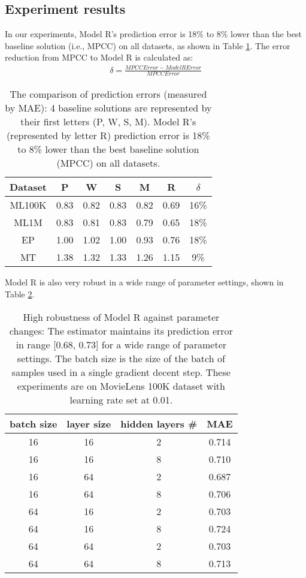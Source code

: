 \documentclass[sigconf]{acmart}
\begin{document}
\subsection{Experiment results}
In our experiments, Model R's prediction error is 18\% to 8\% lower than
the best baseline solution (i.e., MPCC) on all datasets, as shown in Table 
\ref{tab:errors}.
The error reduction from MPCC to Model R is calculated as:
\begin{align*}
	\delta = \frac{MPCCError - ModelRError}{MPCCError}
\end{align*}
\begin{table}[!htb]
	\centering
	\caption{The comparison of prediction errors (measured by MAE): 4 baseline
		solutions are represented by their first letters (P, W, S, M).
		Model R's (represented by letter R) prediction error is 18\% to 8\% 
		lower than the best baseline 
		solution (MPCC) on all datasets.
		}
	\begin{tabular}{ccccccc} \hline
		Dataset & P    & W    & S    & M    & R    & $ \delta $ \\ \hline
		ML100K  & 0.83 & 0.82 & 0.83 & 0.82 & 0.69 & 16\% \\ \hline
		ML1M    & 0.83 & 0.81 & 0.83 & 0.79 & 0.65 & 18\% \\ \hline
		EP      & 1.00 & 1.02 & 1.00 & 0.93 & 0.76 & 18\% \\ \hline
		MT      & 1.38 & 1.32 & 1.33 & 1.26 & 1.15 & 9\%  \\ \hline
	\end{tabular}
	\label{tab:errors}
\end{table}
Model R is also very robust in a wide range of parameter settings, shown in 
Table \ref{tab:robust}.
\begin{table}[!htb]
	\centering
	\caption{High robustness of Model R against parameter changes:
		The estimator maintains its prediction error in range [0.68, 0.73] for 
		a wide range of parameter settings. The batch size is the size of the 
		batch of samples used in a single gradient decent step.
		These experiments are on MovieLens 100K dataset with learning rate set 
		at 0.01.
	}
	\begin{tabular}{cccc}  \hline
		 batch size & layer size & hidden layers \# & MAE \\ \hline
		 16 & 16 & 2 & 0.714 \\ \hline
		 16 & 16 & 8 & 0.710 \\ \hline
		 16 & 64 & 2 & 0.687 \\ \hline
		 16 & 64 & 8 & 0.706 \\ \hline
		 64 & 16 & 2 & 0.703 \\ \hline
		 64 & 16 & 8 & 0.724 \\ \hline
		 64 & 64 & 2 & 0.703 \\ \hline
		 64 & 64 & 8 & 0.713 \\ \hline
	\end{tabular}
	\label{tab:robust}
\end{table}
\end{document}
